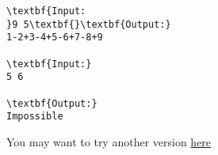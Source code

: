 \begin{verbatim}
\textbf{Input:
}9 5\textbf{}\textbf{Output:}
1-2+3-4+5-6+7-8+9

\textbf{Input:}
5 6

\textbf{Output:}
Impossible

\end{verbatim}

You may want to try another version \href{../../problems/BLOPER2}{here}